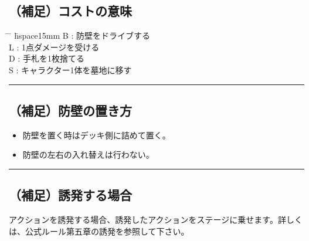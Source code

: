 \documentclass[twocolumn,a5paper,papersize,10pt]{jarticle}
\begin{document}
\subsection*{（補足）コストの意味}
\vspace{-1zh}%
\begin{small}
\begin{tabbing}
 \hspace{2mm} \= \hspace{2mm} \= \hspace{1mm} \= hspace{15mm} \kill
\> B \> : \>防壁をドライブする \\
\> L \> : \>1点ダメージを受ける \\
\> D \> : \>手札を1枚捨てる \\
\> S \> : \>キャラクター1体を墓地に移す \\
\end{tabbing}
\end{small}

\vspace{-3zh}%
\hrule height 0.1mm depth 0mm width 66.5mm %
\vspace{-3zh}%

\subsection*{（補足）防壁の置き方}
\vspace{-1zh}%
\begin{itemize}
\setlength{\leftskip}{-0.3cm}%
\setlength{\parskip}{0pt}      %

\item 防壁を置く時はデッキ側に詰めて置く。
\item 防壁の左右の入れ替えは行わない。
\end{itemize}

\vspace{-1zh}%
\hrule height 0.1mm depth 0mm width 66.5mm %
\vspace{-3zh}%

\subsection*{（補足）誘発する場合}
\vspace{-1zh}%
アクションを誘発する場合、誘発したアクションをステージに乗せます。詳しくは、公式ルール第五章の誘発を参照して下さい。
\vspace{-1zh}%
\end{document}
